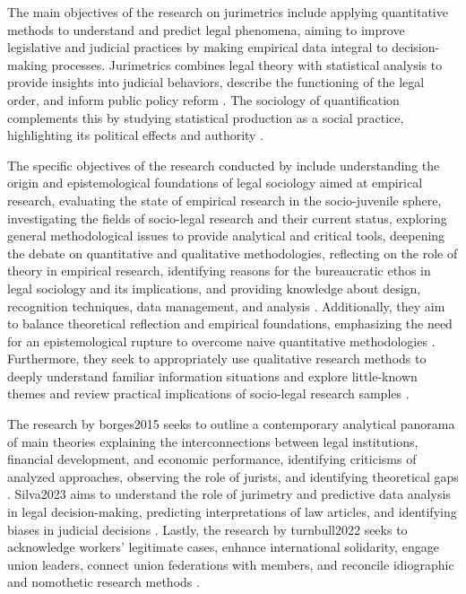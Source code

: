 The main objectives of the research on jurimetrics include applying quantitative methods to understand and predict legal phenomena, aiming to improve legislative and judicial practices by making empirical data integral to decision-making processes. Jurimetrics combines legal theory with statistical analysis to provide insights into judicial behaviors, describe the functioning of the legal order, and inform public policy reform \cite{nunes2018, nunes2018, nunes2018, de2010}. The sociology of quantification complements this by studying statistical production as a social practice, highlighting its political effects and authority \cite{paiva2021}.

The specific objectives of the research conducted by  include understanding the origin and epistemological foundations of legal sociology aimed at empirical research, evaluating the state of empirical research in the socio-juvenile sphere, investigating the fields of socio-legal research and their current status, exploring general methodological issues to provide analytical and critical tools, deepening the debate on quantitative and qualitative methodologies, reflecting on the role of theory in empirical research, identifying reasons for the bureaucratic ethos in legal sociology and its implications, and providing knowledge about design, recognition techniques, data management, and analysis \cite{calvo2024}. Additionally, they aim to balance theoretical reflection and empirical foundations, emphasizing the need for an epistemological rupture to overcome naive quantitative methodologies \cite{calvo2024}. Furthermore, they seek to appropriately use qualitative research methods to deeply understand familiar information situations and explore little-known themes \cite{calvo2024} and review practical implications of socio-legal research samples \cite{calvo2024}.

The research by borges2015 seeks to outline a contemporary analytical panorama of main theories explaining the interconnections between legal institutions, financial development, and economic performance, identifying criticisms of analyzed approaches, observing the role of jurists, and identifying theoretical gaps \cite{borges2015}. Silva2023 aims to understand the role of jurimetry and predictive data analysis in legal decision-making, predicting interpretations of law articles, and identifying biases in judicial decisions \cite{silva2023,silva2023}. Lastly, the research by turnbull2022 seeks to acknowledge workers' legitimate cases, enhance international solidarity, engage union leaders, connect union federations with members, and reconcile idiographic and nomothetic research methods \cite{turnbull2022}.

